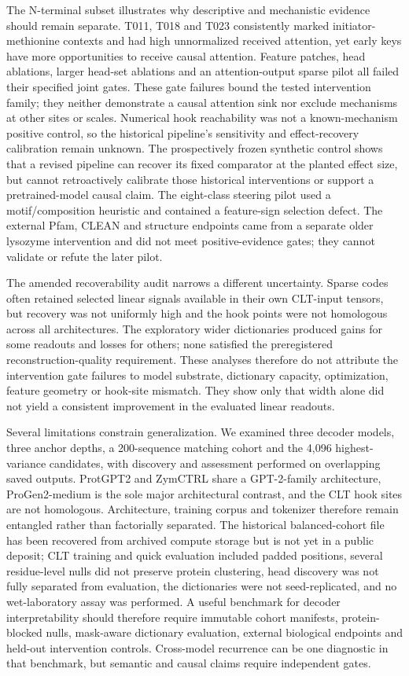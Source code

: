 \documentclass[pdflatex,sn-nature]{sn-jnl}
\begin{document}
The N-terminal subset illustrates why descriptive and mechanistic evidence should remain separate. T011, T018 and T023 consistently marked initiator-methionine contexts and had high unnormalized received attention, yet early keys have more opportunities to receive causal attention. Feature patches, head ablations, larger head-set ablations and an attention-output sparse pilot all failed their specified joint gates. These gate failures bound the tested intervention family; they neither demonstrate a causal attention sink nor exclude mechanisms at other sites or scales. Numerical hook reachability was not a known-mechanism positive control, so the historical pipeline's sensitivity and effect-recovery calibration remain unknown. The prospectively frozen synthetic control shows that a revised pipeline can recover its fixed comparator at the planted effect size, but cannot retroactively calibrate those historical interventions or support a pretrained-model causal claim. The eight-class steering pilot used a motif/composition heuristic and contained a feature-sign selection defect. The external Pfam, CLEAN and structure endpoints came from a separate older lysozyme intervention and did not meet positive-evidence gates; they cannot validate or refute the later pilot.

The amended recoverability audit narrows a different uncertainty. Sparse codes often retained selected linear signals available in their own CLT-input tensors, but recovery was not uniformly high and the hook points were not homologous across all architectures. The exploratory wider dictionaries produced gains for some readouts and losses for others; none satisfied the preregistered reconstruction-quality requirement. These analyses therefore do not attribute the intervention gate failures to model substrate, dictionary capacity, optimization, feature geometry or hook-site mismatch. They show only that width alone did not yield a consistent improvement in the evaluated linear readouts.

Several limitations constrain generalization. We examined three decoder models, three anchor depths, a 200-sequence matching cohort and the 4,096 highest-variance candidates, with discovery and assessment performed on overlapping saved outputs. ProtGPT2 and ZymCTRL share a GPT-2-family architecture, ProGen2-medium is the sole major architectural contrast, and the CLT hook sites are not homologous. Architecture, training corpus and tokenizer therefore remain entangled rather than factorially separated. The historical balanced-cohort file has been recovered from archived compute storage but is not yet in a public deposit; CLT training and quick evaluation included padded positions, several residue-level nulls did not preserve protein clustering, head discovery was not fully separated from evaluation, the dictionaries were not seed-replicated, and no wet-laboratory assay was performed. A useful benchmark for decoder interpretability should therefore require immutable cohort manifests, protein-blocked nulls, mask-aware dictionary evaluation, external biological endpoints and held-out intervention controls. Cross-model recurrence can be one diagnostic in that benchmark, but semantic and causal claims require independent gates.
\end{document}
